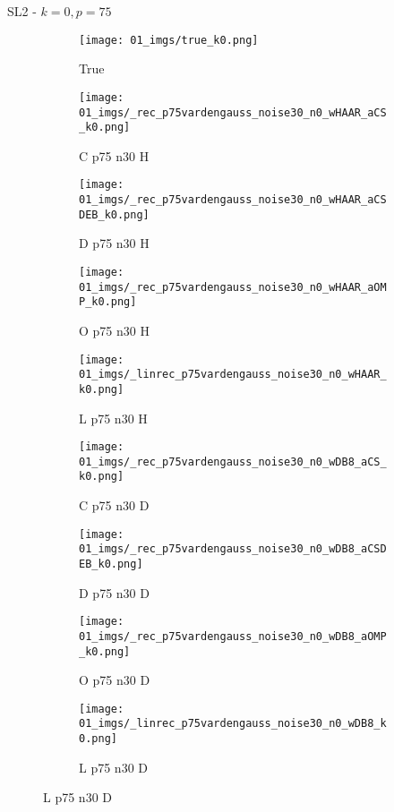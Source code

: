 \begin{frame}{SL2 - $k=0,p=75$}{}
\begin{figure}
\begin{subfigure}{0.1\textwidth}
\texttt{[image: 01\_imgs/true\_k0.png]}
\caption*{\Tiny True}
\end{subfigure}
\begin{subfigure}{0.1\textwidth}
\texttt{[image: 01\_imgs/\_rec\_p75vardengauss\_noise30\_n0\_wHAAR\_aCS\_k0.png]}
\caption*{\Tiny C p75 n30 H}
\end{subfigure}
\begin{subfigure}{0.1\textwidth}
\texttt{[image: 01\_imgs/\_rec\_p75vardengauss\_noise30\_n0\_wHAAR\_aCSDEB\_k0.png]}
\caption*{\Tiny D p75 n30 H}
\end{subfigure}
\begin{subfigure}{0.1\textwidth}
\texttt{[image: 01\_imgs/\_rec\_p75vardengauss\_noise30\_n0\_wHAAR\_aOMP\_k0.png]}
\caption*{\Tiny O p75 n30 H}
\end{subfigure}
\begin{subfigure}{0.1\textwidth}
\texttt{[image: 01\_imgs/\_linrec\_p75vardengauss\_noise30\_n0\_wHAAR\_k0.png]}
\caption*{\Tiny L p75 n30 H}
\end{subfigure}
\begin{subfigure}{0.1\textwidth}
\texttt{[image: 01\_imgs/\_rec\_p75vardengauss\_noise30\_n0\_wDB8\_aCS\_k0.png]}
\caption*{\Tiny C p75 n30 D}
\end{subfigure}
\begin{subfigure}{0.1\textwidth}
\texttt{[image: 01\_imgs/\_rec\_p75vardengauss\_noise30\_n0\_wDB8\_aCSDEB\_k0.png]}
\caption*{\Tiny D p75 n30 D}
\end{subfigure}
\begin{subfigure}{0.1\textwidth}
\texttt{[image: 01\_imgs/\_rec\_p75vardengauss\_noise30\_n0\_wDB8\_aOMP\_k0.png]}
\caption*{\Tiny O p75 n30 D}
\end{subfigure}
\begin{subfigure}{0.1\textwidth}
\texttt{[image: 01\_imgs/\_linrec\_p75vardengauss\_noise30\_n0\_wDB8\_k0.png]}
\caption*{\Tiny L p75 n30 D}
\end{subfigure}
\end{figure}
\end{frame}


